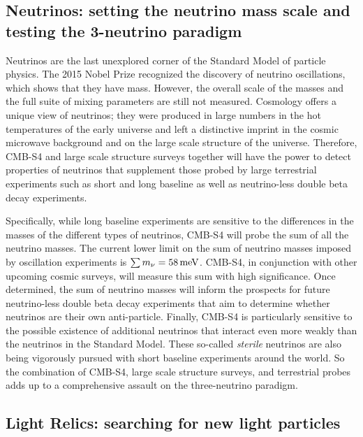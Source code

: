 \subsection*{Neutrinos: setting the neutrino mass scale and testing the 3-neutrino paradigm}


Neutrinos are the last unexplored corner of the Standard Model of particle physics.  The 2015 Nobel Prize recognized the discovery of neutrino oscillations, which shows that they have mass. However, the overall scale of the masses and the full suite of mixing parameters are still not measured.  Cosmology offers a unique view of neutrinos; they were produced in large numbers in the hot temperatures of the early universe and left a distinctive imprint in the cosmic microwave background and on the large scale structure of the universe. Therefore, CMB-S4 and large scale structure surveys together will have the power to detect properties of neutrinos that supplement those probed by large terrestrial experiments such as short and long baseline as well as neutrino-less double beta decay experiments.

Specifically, while long baseline experiments are sensitive to the differences in the masses of the different types of neutrinos, CMB-S4  will probe the sum of all the neutrino masses. The current lower limit on the sum of neutrino masses imposed by oscillation experiments is \mbox{$\sum m_\nu=58\,\rm{meV}$}. CMB-S4, in conjunction with other upcoming cosmic surveys, will measure this sum with high significance. Once determined, the sum of neutrino masses will inform the prospects for future neutrino-less double beta decay experiments that aim to determine whether neutrinos are their own anti-particle. Finally, CMB-S4 is particularly sensitive to the possible existence of additional neutrinos that interact even more weakly than the neutrinos in the Standard Model. These so-called {\it sterile} neutrinos are also being vigorously pursued with short baseline experiments around the world. So the combination of CMB-S4, large scale structure surveys, and terrestrial probes adds up to a comprehensive assault on the three-neutrino paradigm. 

\subsection*{Light Relics: searching for new light particles}

